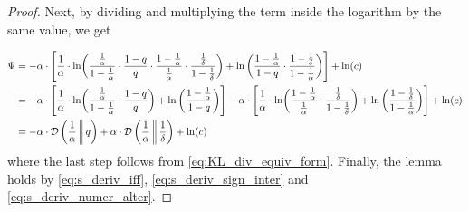 \documentclass[letterpaper,11pt]{article}
\newcommand{\1}[1]{\mathds{1}\left[#1\right]}
\newcommand{\D}[2]{\mathcal{D}\left(#1\, \middle\|\,#2 \right)}
\begin{document}
\begin{proof}
	Next, by dividing and multiplying the term inside the logarithm by the same value, we get

	\begin{align}
	       \Psi &= -\alpha \cdot \Biggl[\frac{1}{\alpha} \cdot \ln\! \left(\frac{\frac{1}{\alpha}}{1 - \frac{1}{\alpha}} \cdot \frac{1 - q}{q} \cdot \frac{1 - \frac{1}{\alpha}}{\frac{1}{\alpha}}\cdot \frac{\frac{1}{\delta}}{1 - \frac{1}{\delta}}\right) + \ln\left(\frac{1 - \frac{1}{\alpha}}{1 - q} \cdot \frac{1 - \frac{1}{\delta}}{1 - \frac{1}{\alpha}} \right)\Biggr] + \ln(c)\notag\\
	       &= -\alpha \cdot \Biggl[\frac{1}{\alpha} \cdot \ln\! \left(\frac{\frac{1}{\alpha}}{1 - \frac{1}{\alpha}} \cdot \frac{1 - q}{q} \right) + \ln\left(\frac{1 - \frac{1}{\alpha}}{1 - q} \right)\Biggr] - \alpha \cdot \Biggl[ \frac{1}{\alpha} \cdot \ln\! \left(\frac{1 - \frac{1}{\alpha}}{\frac{1}{\alpha}}\cdot \frac{\frac{1}{\delta}}{1 - \frac{1}{\delta}}\right) + \ln\left( \frac{1 - \frac{1}{\delta}}{1 - \frac{1}{\alpha}} \right)\Biggr] + \ln(c)\notag\\
	       &= -\alpha \cdot \D{\frac{1}{\alpha}}{q} +  \alpha \cdot \D{\frac{1}{\alpha}}{\frac{1}{\delta}} + \ln(c)\label{eq:s_deriv_numer_alter}			
	\end{align}
	where the last step follows from \eqref{eq:KL_div_equiv_form}.
	Finally, the lemma holds by \eqref{eq:s_deriv_iff}, \eqref{eq:s_deriv_sign_inter} and \eqref{eq:s_deriv_numer_alter}.
\end{proof}

 
\end{document}
